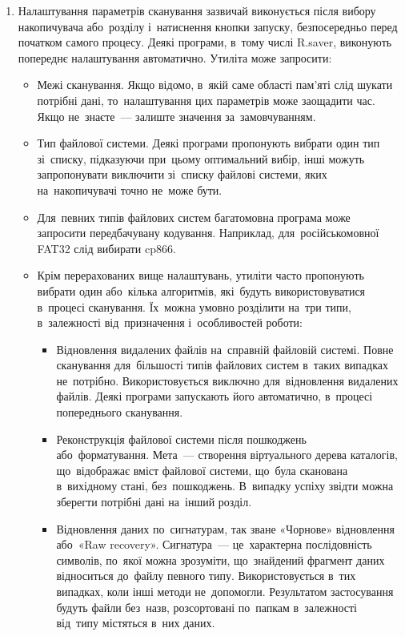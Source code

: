 \documentclass[
	a4paper,
	oneside,
	DIV = 12,
	fontsize = 13pt,
	headings = normal,
]{scrartcl}
\newcommand{\allcaps}[1]{{\addfontfeatures{LetterSpace = 5}#1}}
\begin{document}
\begin{enumerate}
			\item Налаштування параметрів сканування зазвичай виконується після вибору накопичувача або~розділу і~натиснення кнопки запуску, безпосередньо перед початком самого процесу. Деякі програми, в~тому числі \textenglish{R.saver}, виконують попереднє налаштування автоматично. Утиліта може запросити: 
				\begin{itemize}
					\item	Межі сканування. Якщо відомо, в~якій саме області пам'яті слід шукати потрібні дані, то~налаштування цих параметрів може заощадити час. Якщо не~знаєте~— залиште значення за~замовчуванням. 

					\item	Тип файлової системи. Деякі програми пропонують вибрати один тип зі~списку, підказуючи при~цьому оптимальний вибір, інші можуть запропонувати виключити зі~списку файлові системи, яких на~накопичувачі точно не~може бути. 

					\item	Для~певних типів файлових систем багатомовна програма може запросити передбачувану кодування. Наприклад, для~російськомовної \textenglish{\allcaps{FAT32}} слід вибирати \textenglish{cp866}. 

					\item	Крім перерахованих вище налаштувань, утиліти часто пропонують вибрати один або~кілька алгоритмів, які~будуть використовуватися в~процесі сканування. Їх~можна умовно розділити на~три типи, в~залежності від~призначення і~особливостей роботи: 
						\begin{itemize}
							\item Відновлення видалених файлів на~справній файловій системі. Повне сканування для~більшості типів файлових систем в~таких випадках не~потрібно. Використовується виключно для~відновлення видалених файлів. Деякі програми запускають його автоматично, в~процесі попереднього сканування. 

							\item Реконструкція файлової системи після пошкоджень або~форматування. Мета~— створення віртуального дерева каталогів, що~відображає вміст файлової системи, що~була сканована в~вихідному стані, без~пошкоджень. В~випадку успіху звідти можна зберегти потрібні дані на~інший розділ. 

							\item Відновлення даних по~сигнатурам, так зване «Чорнове» відновлення або~«Raw recovery». Сигнатура~— це~характерна послідовність символів, по~якої можна зрозуміти, що~знайдений фрагмент даних відноситься до~файлу певного типу. Використовується в~тих випадках, коли інші методи не~допомогли. Результатом застосування будуть файли без~назв, розсортовані по~папкам в~залежності від~типу містяться в~них даних. 
						\end{itemize}
				\end{itemize}


\end{enumerate}
\end{document}
